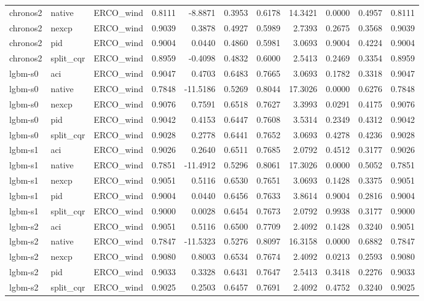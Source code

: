 \begin{tabular}{lllrrrrrrrr}
chronos2 & native & ERCO_wind & 0.8111 & -8.8871 & 0.3953 & 0.6178 & 14.3421 & 0.0000 & 0.4957 & 0.8111 \\
chronos2 & nexcp & ERCO_wind & 0.9039 & 0.3878 & 0.4927 & 0.5989 & 2.7393 & 0.2675 & 0.3568 & 0.9039 \\
chronos2 & pid & ERCO_wind & 0.9004 & 0.0440 & 0.4860 & 0.5981 & 3.0693 & 0.9004 & 0.4224 & 0.9004 \\
chronos2 & split_cqr & ERCO_wind & 0.8959 & -0.4098 & 0.4832 & 0.6000 & 2.5413 & 0.2469 & 0.3354 & 0.8959 \\
lgbm-s0 & aci & ERCO_wind & 0.9047 & 0.4703 & 0.6483 & 0.7665 & 3.0693 & 0.1782 & 0.3318 & 0.9047 \\
lgbm-s0 & native & ERCO_wind & 0.7848 & -11.5186 & 0.5269 & 0.8044 & 17.3026 & 0.0000 & 0.6276 & 0.7848 \\
lgbm-s0 & nexcp & ERCO_wind & 0.9076 & 0.7591 & 0.6518 & 0.7627 & 3.3993 & 0.0291 & 0.4175 & 0.9076 \\
lgbm-s0 & pid & ERCO_wind & 0.9042 & 0.4153 & 0.6447 & 0.7608 & 3.5314 & 0.2349 & 0.4312 & 0.9042 \\
lgbm-s0 & split_cqr & ERCO_wind & 0.9028 & 0.2778 & 0.6441 & 0.7652 & 3.0693 & 0.4278 & 0.4236 & 0.9028 \\
lgbm-s1 & aci & ERCO_wind & 0.9026 & 0.2640 & 0.6511 & 0.7685 & 2.0792 & 0.4512 & 0.3177 & 0.9026 \\
lgbm-s1 & native & ERCO_wind & 0.7851 & -11.4912 & 0.5296 & 0.8061 & 17.3026 & 0.0000 & 0.5052 & 0.7851 \\
lgbm-s1 & nexcp & ERCO_wind & 0.9051 & 0.5116 & 0.6530 & 0.7651 & 3.0693 & 0.1428 & 0.3375 & 0.9051 \\
lgbm-s1 & pid & ERCO_wind & 0.9004 & 0.0440 & 0.6456 & 0.7633 & 3.8614 & 0.9004 & 0.2816 & 0.9004 \\
lgbm-s1 & split_cqr & ERCO_wind & 0.9000 & 0.0028 & 0.6454 & 0.7673 & 2.0792 & 0.9938 & 0.3177 & 0.9000 \\
lgbm-s2 & aci & ERCO_wind & 0.9051 & 0.5116 & 0.6500 & 0.7709 & 2.4092 & 0.1428 & 0.3240 & 0.9051 \\
lgbm-s2 & native & ERCO_wind & 0.7847 & -11.5323 & 0.5276 & 0.8097 & 16.3158 & 0.0000 & 0.6882 & 0.7847 \\
lgbm-s2 & nexcp & ERCO_wind & 0.9080 & 0.8003 & 0.6534 & 0.7674 & 2.4092 & 0.0213 & 0.2593 & 0.9080 \\
lgbm-s2 & pid & ERCO_wind & 0.9033 & 0.3328 & 0.6431 & 0.7647 & 2.5413 & 0.3418 & 0.2276 & 0.9033 \\
lgbm-s2 & split_cqr & ERCO_wind & 0.9025 & 0.2503 & 0.6457 & 0.7691 & 2.4092 & 0.4752 & 0.3240 & 0.9025 \\

\end{tabular}
